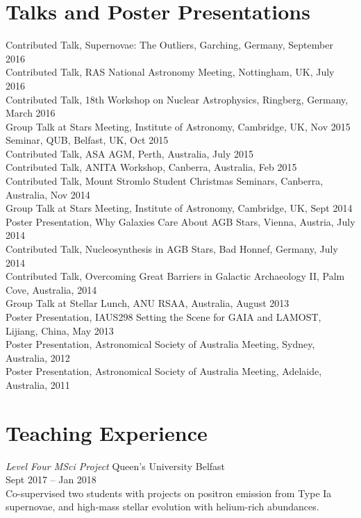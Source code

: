 \documentclass[11pt]{res} %
\begin{document}
\begin{resume}
\section{Talks and Poster Presentations}
  Contributed Talk, Supernovae: The Outliers, Garching, Germany, September 2016\\
  Contributed Talk, RAS National Astronomy Meeting, Nottingham, UK, July 2016\\
  Contributed Talk, 18th Workshop on Nuclear Astrophysics, Ringberg, Germany, March 2016\\
  Group Talk at Stars Meeting, Institute of Astronomy, Cambridge, UK, Nov 2015\\
  Seminar, QUB, Belfast, UK, Oct 2015\\
  Contributed Talk, ASA AGM, Perth, Australia, July 2015\\
  Contributed Talk, ANITA Workshop, Canberra, Australia, Feb 2015\\
  Contributed Talk, Mount Stromlo Student Christmas Seminars, Canberra, Australia, Nov 2014\\
  Group Talk at Stars Meeting, Institute of Astronomy, Cambridge, UK, Sept 2014\\
  Poster Presentation, Why Galaxies Care About AGB Stars, Vienna, Austria, July 2014\\
  Contributed Talk, Nucleosynthesis in AGB Stars, Bad Honnef, Germany, July 2014\\
  Contributed Talk, Overcoming Great Barriers in Galactic Archaeology II, Palm Cove, Australia, 2014\\
  Group Talk at Stellar Lunch, ANU RSAA, Australia, August 2013\\
  Poster Presentation, IAUS298 Setting the Scene for GAIA and LAMOST, Lijiang, China, May 2013\\
  Poster Presentation, Astronomical Society of Australia Meeting, Sydney, Australia, 2012\\
  Poster Presentation, Astronomical Society of Australia Meeting, Adelaide, Australia, 2011

\section{Teaching Experience}
  {\it Level Four MSci Project} \hfill Queen's University Belfast\\
  \null\hfill Sept 2017 -- Jan 2018\\
  Co-supervised two students with projects on positron emission from Type Ia supernovae,
  and high-mass stellar evolution with helium-rich abundances.\\


\end{resume}
\end{document}
